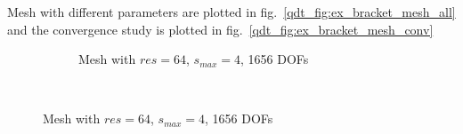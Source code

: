 



Mesh with different parameters are plotted in fig.~\ref{qdt_fig:ex_bracket_mesh_all} and the convergence study is plotted in fig.~\ref{qdt_fig:ex_bracket_mesh_conv}

\begin{figure}[H]
    \begin{subfigure}[b]{1\linewidth}
        \centering
        \caption{Mesh with $res=64$, $s_{max}=4$, 1656 DOFs}
    \end{subfigure}
    \\
\end{figure}

